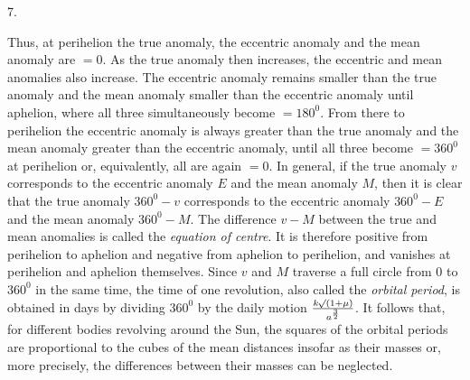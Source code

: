 \par{}
\begin{center}
7.
\end{center}
Thus, at perihelion the true anomaly, the eccentric anomaly and the mean anomaly are $= 0$.
As the true anomaly then increases, the eccentric and mean anomalies also increase.
The eccentric anomaly remains smaller than the true anomaly and the mean anomaly smaller
than the eccentric anomaly until aphelion, where all three simultaneously become $= 180^0$.
From there to perihelion the eccentric anomaly is always greater than the true anomaly
and the mean anomaly greater than the eccentric anomaly, until all three become $= 360^0$
at perihelion or, equivalently, all are again $= 0$. In general, if the true anomaly $v$ corresponds to the eccentric anomaly $E$ and the
mean anomaly $M$, then it is clear that the true anomaly $360^0-v$ corresponds to the
eccentric anomaly $360^0-E$ and the mean anomaly $360^0-M$. The difference $v-M$ between the true and mean anomalies is called the
\emph{equation of centre}. It is therefore positive from perihelion to aphelion and
negative from aphelion to perihelion, and vanishes at perihelion and aphelion themselves.
Since $v$ and $M$ traverse a full circle from $0$ to $360^0$ in the same time, the time
of one revolution, also called the \emph{orbital period}, is obtained in days by
dividing $360^0$ by the daily motion $\frac{k\mathord{{}^{}\!\surd}(1+\mu)}{a^{\frac{3}{2}}}$.
It follows that, for different bodies revolving around the Sun, the squares of the
orbital periods are proportional to the cubes of the mean distances insofar as
their masses or, more precisely, the differences between their masses can be neglected.
